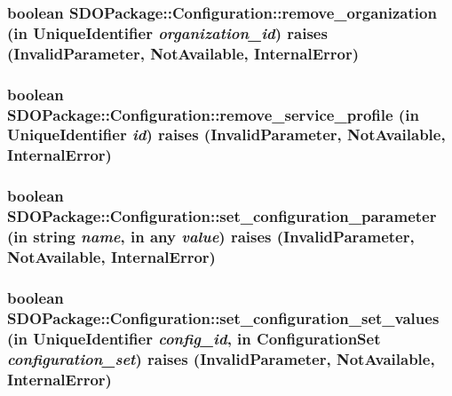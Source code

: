 \subsubsection{\setlength{\rightskip}{0pt plus 5cm}boolean SDOPackage::Configuration::remove\_\-organization (in {\bf Unique\-Identifier} {\em organization\_\-id})  raises (Invalid\-Parameter, Not\-Available, Internal\-Error)}\label{interfaceSDOPackage_1_1Configuration_SDOPackage_1_1Configurationa4}


\subsubsection{\setlength{\rightskip}{0pt plus 5cm}boolean SDOPackage::Configuration::remove\_\-service\_\-profile (in {\bf Unique\-Identifier} {\em id})  raises (Invalid\-Parameter, Not\-Available, Internal\-Error)}\label{interfaceSDOPackage_1_1Configuration_SDOPackage_1_1Configurationa3}


\subsubsection{\setlength{\rightskip}{0pt plus 5cm}boolean SDOPackage::Configuration::set\_\-configuration\_\-parameter (in string {\em name}, in any {\em value})  raises (Invalid\-Parameter, Not\-Available, Internal\-Error)}\label{interfaceSDOPackage_1_1Configuration_SDOPackage_1_1Configurationa8}


\subsubsection{\setlength{\rightskip}{0pt plus 5cm}boolean SDOPackage::Configuration::set\_\-configuration\_\-set\_\-values (in {\bf Unique\-Identifier} {\em config\_\-id}, in {\bf Configuration\-Set} {\em configuration\_\-set})  raises (Invalid\-Parameter, Not\-Available, Internal\-Error)}\label{interfaceSDOPackage_1_1Configuration_SDOPackage_1_1Configurationa11}


